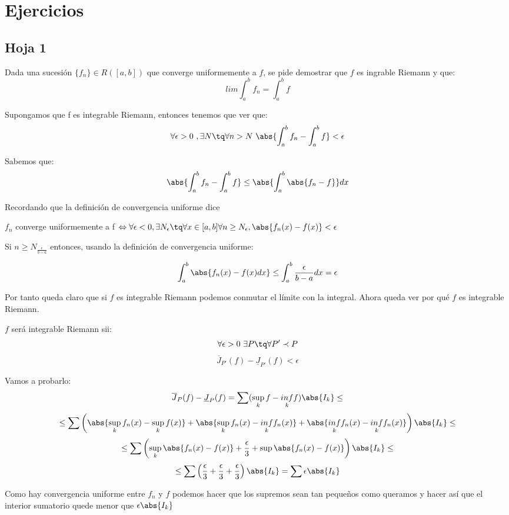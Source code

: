 \section{Ejercicios}
\subsection{Hoja 1}
\begin{problem}[Ejercicio 5]
Dada una sucesión $\lbrace f_n \rbrace \in R([a,b])$ que converge uniformemente a $f$, se pide demostrar que $f$ es ingrable Riemann y que:
\[ lim \int_{a}^{b} f_n = \int_{a}^{b} f \]

\solution
Supongamos que f es integrable Riemann, entonces tenemos que ver que:
\[ \forall \epsilon > 0 \ , \exists N \tq \forall n> N \ \abs{\int_a^b f_n - \int_a^b f} < \epsilon\]

Sabemos que:
\[\abs{\int_a^b f_n - \int_a^b f} \leq \abs{\int_a^b \abs{f_n -f}} dx\]

Recordando que la definición de convergencia uniforme dice

$f_n$ converge uniformemente a f $\Leftrightarrow \forall \epsilon < 0, \exists N_{\epsilon} \tq \forall x \in [a,b] \\ \forall n \geq N_{\epsilon}, \abs{f_n (x) - f(x)} < \epsilon$


Si $n \geq N_{\frac{\epsilon}{b-a}}$ entonces, usando la definición de convergencia uniforme:

\[\int_a^b \abs{f_n(x) - f(x) dx} \leq \int_a^b \frac{\epsilon}{b-a}dx = \epsilon\]

Por tanto queda claro que si $f$ es integrable Riemann podemos conmutar el límite con la integral. Ahora queda ver por qué $f$ es integrable Riemann.

$f$ será integrable Riemann sii:
\[\forall \epsilon > 0 \ \exists P \tq \forall P' \prec P \]
\[\overline{J}_{P'}(f) - \underline{J}_{P'}(f) < \epsilon\]

Vamos a probarlo:
\[\overline{J}_P(f) - \underline{J}_P(f) = \sum(\sup_k f - \underset{k}{inf} f)\abs{I_k} \leq\]
\[\leq \sum\left( \abs{\sup_{k}f_n(x) - \sup_{k}f(x)} + \abs{\sup_{k}f_n(x) - \underset{k}{inf}f_n(x)} +  \abs{\underset{k}{inf}f_n(x) - \underset{k}{inf}f_n(x)} \right)\abs{I_k} \leq \]
\[\leq \sum\left( \sup_{k} \abs{f_n(x) - f(x)} + \frac{\epsilon}{3} + \sup \abs{f_n(x) - f(x)} \right)\abs{I_k} \leq\]
\[\leq \sum \left(\frac{\epsilon}{3} + \frac{\epsilon}{3} + \frac{\epsilon}{3} \right)\abs{I_k} = \sum\epsilon\abs{I_k}\]

Como hay convergencia uniforme entre $f_n$ y $f$ podemos hacer que los supremos sean tan pequeños como queramos y hacer así que el interior sumatorio quede menor que $\epsilon \abs{I_k}$

\end{problem}

